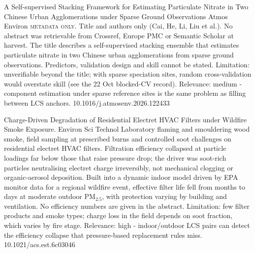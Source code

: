 \documentclass[10pt]{article}
\begin{document}
{A Self-supervised Stacking Framework for Estimating Particulate Nitrate in Two Chinese Urban Agglomerations under Sparse Ground Observations}
{Atmos Environ}
{\textsc{metadata only.} Title and authors only (Cai, He, Li, Liu et al.). No abstract was retrievable from Crossref, Europe PMC or Semantic Scholar at harvest. The title describes a self-supervised stacking ensemble that estimates particulate nitrate in two Chinese urban agglomerations from sparse ground observations. Predictors, validation design and skill cannot be stated. Limitation: unverifiable beyond the title; with sparse speciation sites, random cross-validation would overstate skill (see the 22 Oct blocked-CV record). Relevance: medium - component estimation under sparse reference sites is the same problem as filling between LCS anchors.}
{10.1016/j.atmosenv.2026.122433}

\par{}\baselineskip{}\baselineskip
{}

{Charge-Driven Degradation of Residential Electret HVAC Filters under Wildfire Smoke Exposure.}
{Environ Sci Technol}
{Laboratory flaming and smouldering wood smoke, field sampling at prescribed burns and controlled soot challenges on residential electret HVAC filters. Filtration efficiency collapsed at particle loadings far below those that raise pressure drop; the driver was soot-rich particles neutralising electret charge irreversibly, not mechanical clogging or organic-aerosol deposition. Built into a dynamic indoor model driven by EPA monitor data for a regional wildfire event, effective filter life fell from months to days at moderate outdoor PM$_{2.5}$, with protection varying by building and ventilation. No efficiency numbers are given in the abstract. Limitation: few filter products and smoke types; charge loss in the field depends on soot fraction, which varies by fire stage. Relevance: high - indoor/outdoor LCS pairs can detect the efficiency collapse that pressure-based replacement rules miss.}
{10.1021/acs.est.6c03046}
\end{document}
